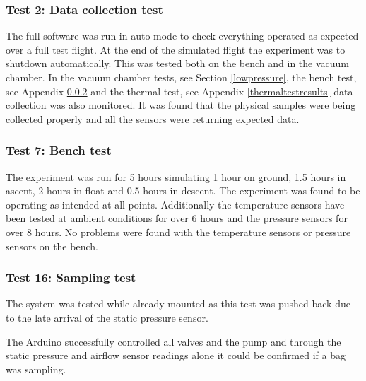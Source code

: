 \subsubsection{Test 2: Data collection test}
The full software was run in auto mode to check everything operated as expected over a full test flight. At the end of the simulated flight the experiment was to shutdown automatically. This was tested both on the bench and in the vacuum chamber. In the vacuum chamber tests, see Section \ref{lowpressure}, the bench test, see Appendix \ref{benchtest} and the thermal test, see Appendix \ref{thermaltestresults} data collection was also monitored. It was found that the physical samples were being collected properly and all the sensors were returning expected data.


\subsubsection{Test 7: Bench test}\label{benchtest}
The experiment was run for 5 hours simulating 1 hour on ground, 1.5 hours in ascent, 2 hours in float and 0.5 hours in descent. The experiment was found to be operating as intended at all points. Additionally the temperature sensors have been tested at ambient conditions for over 6 hours and the pressure sensors for over 8 hours. No problems were found with the temperature sensors or pressure sensors on the bench. 

 

\subsubsection{Test 16: Sampling test}
The system was tested while already mounted as this test was pushed back due to the late arrival of the static pressure sensor.

The Arduino successfully controlled all valves and the pump and through the static pressure and airflow sensor readings alone it could be confirmed if a bag was sampling.

